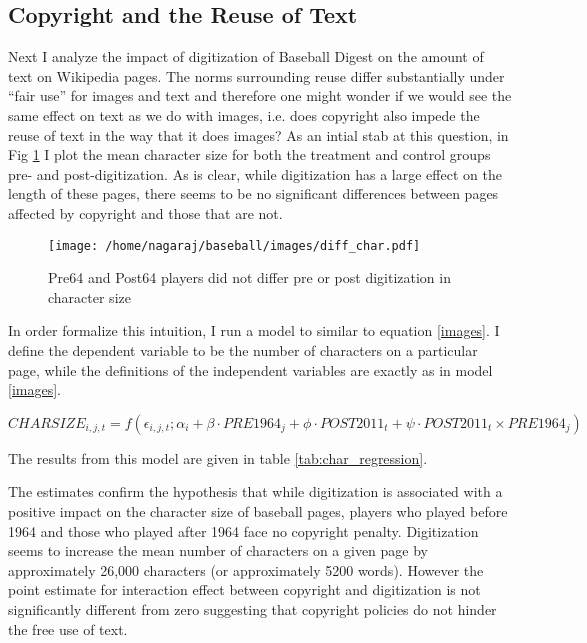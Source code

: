 \documentclass[12pt]{article}
\begin{document}
\subsection{Copyright and the Reuse of Text}

Next I analyze the impact of digitization of Baseball Digest on the amount of text on Wikipedia pages. The norms surrounding reuse differ substantially under ``fair use'' for images and text and therefore one might wonder if we would see the same effect on text as we do with images, i.e. does copyright also impede the reuse of text in the way that it does images? As an intial stab at this question, in Fig \ref{fig:diff_char} I plot the mean character size for both the treatment and control groups pre- and post-digitization. As is clear, while digitization has a large effect on the length of these pages, there seems to be no significant differences between pages affected by copyright and those that are not. 

\begin{figure}[h]
\centering
\texttt{[image: /home/nagaraj/baseball/images/diff\_char.pdf]}
\caption{Pre64 and Post64 players did not differ pre or post digitization in character size}
\label{fig:diff_char}
\end{figure}

In order formalize this intuition, I run a model to similar to equation \eqref{images}. I define the dependent variable to be the number of characters on a particular page, while the definitions of the independent variables are exactly as in model \eqref{images}. 

\begin{equation}
CHARSIZE_{i,j,t} = f(\epsilon_{i,j,t}; \alpha_i + \beta \cdot PRE1964_{j}+ \phi \cdot POST2011_{t} + \psi \cdot POST2011_{t} \times PRE1964_{j})
\end{equation}

The results from this model are given in table \ref{tab:char_regression}. 

The estimates confirm the hypothesis that while digitization is associated with a positive impact on the character size of baseball pages, players who played before 1964 and those who played after 1964 face no copyright penalty. Digitization seems to increase the mean number of characters on a given page by approximately 26,000 characters (or approximately 5200 words). However the point estimate for interaction effect between copyright and digitization is not significantly different from zero suggesting that copyright policies do not hinder the free use of text. 
\end{document}
